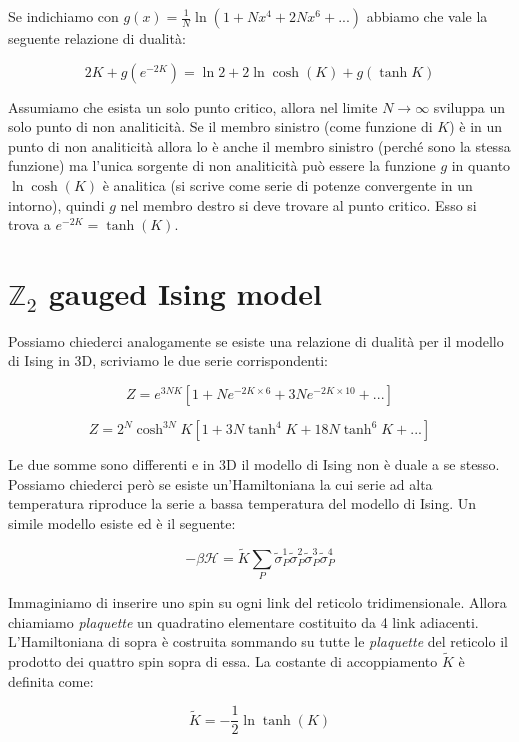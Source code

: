 \documentclass[12pt,a4paper]{article}
\begin{document}
Se indichiamo con $g(x) = \frac{1}{N} \ln \left( 1 + N x^4 + 2 N x^6 + ... \right)$ abbiamo che vale la seguente relazione di dualità:

\begin{equation}
2 K + g \left( e^{-2 K} \right) = \ln 2 + 2 \ln \cosh(K) + g(\tanh K)
\end{equation}

Assumiamo che esista un solo punto critico, allora nel limite $N \rightarrow \infty$ sviluppa un solo punto di non analiticità. Se il membro sinistro (come funzione di $K$) è in un punto di non analiticità allora lo è anche il membro sinistro (perché sono la stessa funzione) ma l'unica sorgente di non analiticità può essere la funzione $g$ in quanto  $\ln \cosh(K)$ è analitica (si scrive come serie di potenze convergente in un intorno), quindi $g$ nel membro destro si deve trovare al punto critico. Esso si trova a $e^{-2 K} = \tanh (K)$.

\section{$\mathbb{Z}_2$ gauged Ising model}
Possiamo chiederci analogamente se esiste una relazione di dualità per il modello di Ising in 3D, scriviamo le due serie corrispondenti:

\[
Z = e^{3 N K} \left[ 1 + N e^{- 2K \times 6} + 3 N e^{-2K \times 10} + ... \right]
\]

\[
Z = 2^N \cosh^{3N} K \left[ 1 + 3 N \tanh^4 K + 18 N \tanh^6 K + ... \right]
\]

Le due somme sono differenti e in 3D il modello di Ising non è duale a se stesso. Possiamo chiederci però se esiste un'Hamiltoniana la cui serie ad alta temperatura riproduce la serie a bassa temperatura del modello di Ising. Un simile modello esiste ed è il seguente:

\begin{equation}
-\beta \mathcal{H} = \tilde{K} \sum_{P} \tilde{\sigma}_P^1 \tilde{\sigma}_P^2 \tilde{\sigma}_P^3 \tilde{\sigma}_P^4
\end{equation}

Immaginiamo di inserire uno spin su ogni link del reticolo tridimensionale. Allora chiamiamo \emph{plaquette} un quadratino elementare costituito da 4 link adiacenti. L'Hamiltoniana di sopra è costruita sommando su tutte le \emph{plaquette} del reticolo il prodotto dei quattro spin sopra di essa. La costante di accoppiamento $\tilde{K}$ è definita come:

\begin{equation}
\tilde{K} = -\frac{1}{2} \ln \tanh \left( K \right)
\end{equation}
\end{document}

